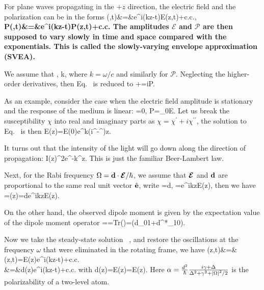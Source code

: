 For plane waves propagating in the $+z$ direction, the electric field and the polarization can be in the forms
\bea
\bE(\br,t)&=&e^{i(kz-\omega t)}\mathcal E(z,t)+c.c.,\\
\bf P(\br,t)&=&e^{i(kz-\omega t)}\mathcal P(z,t)+c.c.
\eea
The amplitudes $\mathcal E$ and $\mathcal P$ are then supposed to vary slowly in time and space compared with the exponentials. This is called the slowly-varying envelope approximation (SVEA). 

We assume that
\bea
{}\ll \omega{}, \quad {}\ll k, 
\eea
where $k=\omega/c$ and similarly for $\mathcal P$. Neglecting the higher-order derivatives, then Eq.~ is reduced to 
\bea
{}+=i\mathcal P.
\label{BASIC_EQ}
\eea

As an example, consider the case when the electric field amplitude is stationary and the response of the medium is linear:
\bea
{}=0, \quad \mathcal P=\epsilon_0\chi\mathcal E.
\eea
Let us break the susceptibility $\chi$ into real and imaginary parts as $\chi=\chi^\prime+i\chi^{\prime\prime}$, the solution to Eq.~  is then
\bea
\mathcal E(z)=\mathcal E(0)e^{k(i\chi^\prime-\chi^{\prime\prime})z}.
\eea

It turns out that the intensity of the light will go down along the direction of propagation:
\bea
I(z)\propto{}^2\propto e^{-k\chi^{\prime\prime}z}.
\eea
This is just the familiar Beer-Lambert law.

Next, for the Rabi frequency $\Omega=\bd\cdot\cbE/\hbar$, we assume that $\cbE$ and ${\bf d}$ are proportional to the same real unit vector $\hat {\bf e}$, write
\bea
\bd=d, \quad \cbE=e^{ikz}\mathcal E(z),
\eea
then we have
\bea
\Omega=\Omega(z)=de^{ikz}\mathcal E(z).
\eea

On the other hand, the observed dipole moment is given by the expectation value of the dipole moment operator
\bea
\bd=\langle\hat{\bd}\rangle=Tr\left(\hat{\bd}\rho\right)=(d\rho_{01}+d^*\rho_{10}).
\eea

Now we take the steady-state solution ~, and restore the oscillations at the frequency $\omega$ that were eliminated in the rotating frame, we have
\bea
\bd(z,t)&=&\langle\hat{\bd}\rangle(z,t)=\mathcal E(z)e^{i(kz-\omega t)}+c.c.\nonumber\\
&=&d(z)e^{i(kz-\omega t)}+c.c.
\eea
with
\bea
d(z)=\mathcal E(z)=\alpha\mathcal E(z).
\eea
Here $\alpha=\frac{d^2}{\hbar}\frac{i\gamma+\Delta}{\Delta^2+\gamma^2+\left| \Omega \right|^2/2}$ is the polarizability of a two-level atom.

